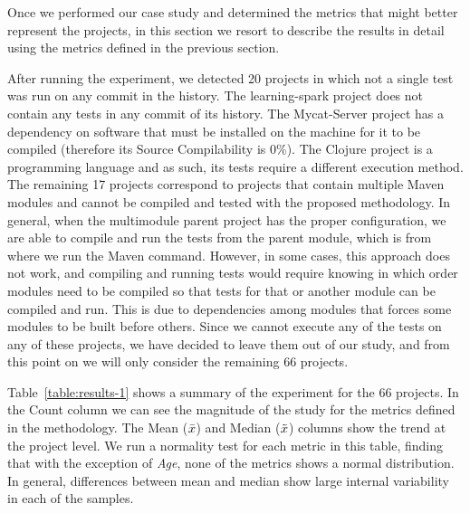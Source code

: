 Once we performed our case study and determined the metrics that might better represent the projects, in this section we resort to describe the results in detail using the metrics defined in the previous section.

After running the experiment, we detected 20 projects in which not a single test was run on any commit in the history. 
The learning-spark project does not contain any tests in any commit of its history. 
The Mycat-Server project has a dependency on software that must be installed on the machine for it to be compiled (therefore its Source Compilability is 0\%). 
The Clojure project is a programming language and as such, its tests require a different execution method. 
The remaining 17 projects correspond to projects that contain multiple Maven modules and cannot be compiled and tested with the proposed methodology. In general, when the multimodule parent project has the proper configuration, we are able to compile and run the tests from the parent module, which is from where we run the Maven command. However, in some cases, this approach does not work, and compiling and running tests would require knowing in which order modules need to be compiled so that tests for that or another module can be compiled and run. This is due to dependencies among modules that forces some modules to be built before others. 
Since we cannot execute any of the tests on any of these projects, we have decided to leave them out of our study, and from this point on we will only consider the remaining 66 projects.

Table~\ref{table:results-1} shows a summary of the experiment for the 66 projects. 
In the Count column we can see the magnitude of the study for the metrics defined in the methodology. 
The Mean ({\large$\bar{x}$}) and Median ({\large$\tilde{x}$}) columns show the trend at the project level.
We run a normality test for each metric in this table, finding that with the exception of \textit{Age}, none of the metrics shows a normal distribution. 
In general, differences between mean and median show large internal variability in each of the samples.

